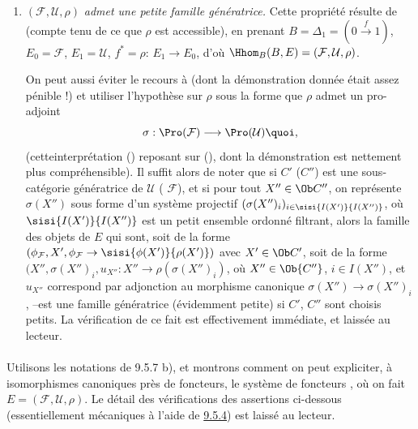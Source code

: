 \documentclass[10pt]{../fichiers-configuration-latex/smfart}
\begin{document}
\begin{enumerate}
\item $(\mathcal{F},\mathcal{U},\rho)$ \emph{admet une petite famille
génératrice.} Cette propriété résulte de  (compte tenu de
ce que $\rho$ est accessible), en prenant
$B=\Delta_1=(0\xrightarrow{f}1)$, $E_0=\mathcal{F}$,
$E_{1}=\mathcal{U}$, $f^{\ast}=\rho$: $E_1\rightarrow E_0$, d'où
$\Hhom_B(B,E)=(\mathcal{F},\mathcal{U},\rho)$.

On peut aussi éviter le recours à  (dont la démonstration
donnée était assez pénible !) et utiliser l'hypothèse sur $\rho$
sous la forme que $\rho$ admet un pro-adjoint
$$
\sigma:\Pro(\mathcal{F})\longrightarrow \Pro(\mathcal{U}){\quoi},
$$
(cette\pageoriginale interprétation () reposant sur
(), dont la démonstration est nettement plus
compréhensible). Il suffit alors de noter que si $C'$ (\resp $C''$)
est une sous-catégorie génératrice de $\mathcal{U}$ (\resp
$\mathcal{F}$), et si pour tout $X''\in \Ob C''$, on représente
$\sigma(X'')$ sous forme d'un système projectif
$(\sigma(X'')_i)_{i\in \sisi{I(X')}{I(X'')}}$, où
$\sisi{I(X')}{I(X'')}$ est un petit ensemble
ordonné filtrant, alors la famille des objets de $E$ qui sont, soit
de la forme $(\phi_{\mathcal{F}}, X',\phi_{\mathcal{F}}\rightarrow
\sisi{\phi(X')}{\rho(X')})$ avec $X'\in \Ob C'$, soit de la forme $(X'',\sigma
(X'')_i, u_{X''}:X''\rightarrow \rho(\sigma (X'')_i)$, où $X''\in \Ob
{C''}$, $i\in I (X'')$, et $u_{X''}$ correspond par adjonction au
morphisme canonique $\sigma(X'')\rightarrow \sigma (X'')_i$, --est
une famille génératrice (évidemment petite) si $C'$, $C''$ sont
choisis petits. La vérification de ce fait est effectivement
immédiate, et laissée au lecteur.
\end{enumerate}

\setcounter{subsubsection}{4} \setcounter{paragraph}{7}
\paragraph{}
Utilisons les notations de 9.5.7 b), et montrons comment on peut
expliciter, à isomorphismes canoniques près de foncteurs, le système
de foncteurs , où on fait
$E=(\mathcal{F},\mathcal{U},\rho)$. Le détail des vérifications des
assertions ci-dessous (essentiellement mécaniques à l'aide de
\hyperref[IV.theo9.5.4]{9.5.4}) est laissé au lecteur.
\end{document}
